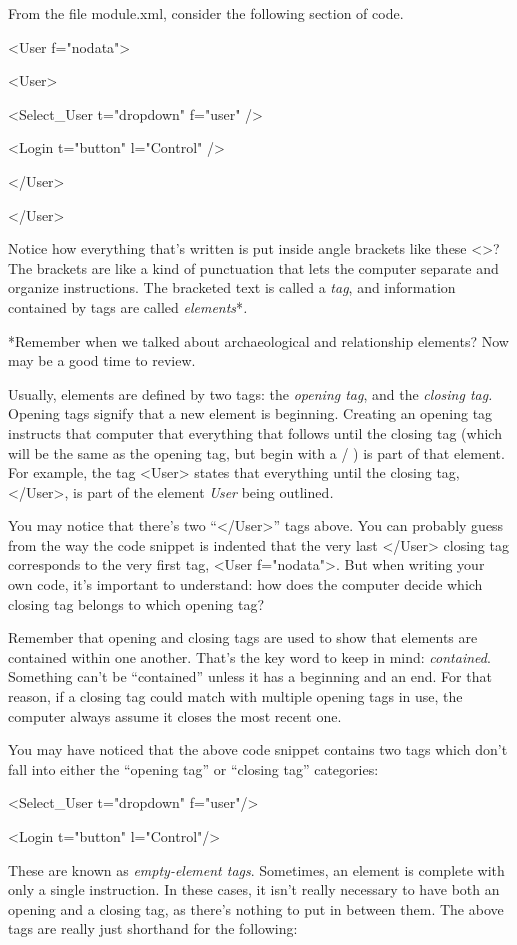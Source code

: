 From the file module.xml, consider the following section of code.

<User f="nodata">

<User>

<Select_User t="dropdown" f="user" />

<Login t="button" l="Control" />

</User>

</User>

Notice how everything that's written is put inside angle brackets like these <>? The brackets are like a kind of punctuation that lets the computer separate and organize instructions. The bracketed text is called a {\em tag}, and information contained by tags are called {\em elements}*{\em .}

*Remember when we talked about archaeological and relationship elements? Now may be a good time to review.

Usually, elements are defined by two tags: the {\em opening tag}, and the {\em closing tag.} Opening tags signify that a new element is beginning. Creating an opening tag instructs that computer that everything that follows until the closing tag (which will be the same as the opening tag, but begin with a / ) is part of that element. For example, the tag <User> states that everything until the closing tag, </User>, is part of the element {\em User} being outlined{\em . }

You may notice that there's two “</User>” tags above. You can probably guess from the way the code snippet is indented that the very last </User> closing tag corresponds to the very first tag, <User f="nodata">. But when writing your own code, it's important to understand: how does the computer decide which closing tag belongs to which opening tag?

Remember that opening and closing tags are used to show that elements are contained within one another. That's the key word to keep in mind: {\em contained}. Something can't be “contained” unless it has a beginning and an end. For that reason, if a closing tag could match with multiple opening tags in use, the computer always assume it closes the most recent one.

You may have noticed that the above code snippet contains two tags which don't fall into either the “opening tag” or “closing tag” categories:

<Select_User t="dropdown" f="user"/>

<Login t="button" l="Control"/>

These are known as {\em empty-element tags}. Sometimes, an element is complete with only a single instruction. In these cases, it isn't really necessary to have both an opening and a closing tag, as there's nothing to put in between them. The above tags are really just shorthand for the following:

